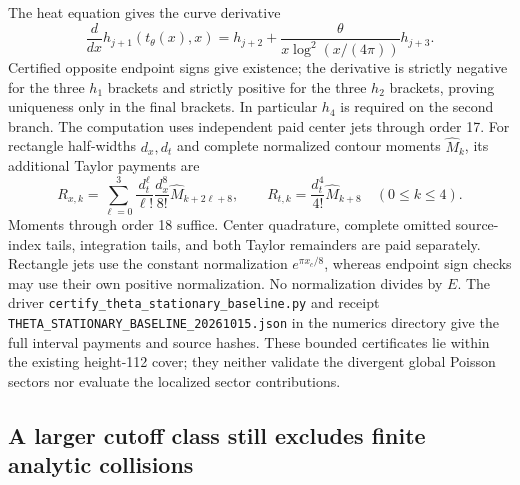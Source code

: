 \documentclass[11pt]{article}
\numberwithin{equation}{section}
\theoremstyle{definition}
\theoremstyle{remark}
\begin{document}
The heat equation gives the curve derivative
\[
 \frac{d}{dx}h_{j+1}(t_\theta(x),x)
 =h_{j+2}+\frac{\theta}{x\log^2(x/(4\pi))}h_{j+3}.
\]
Certified opposite endpoint signs give existence; the derivative is
strictly negative for the three $h_1$ brackets and strictly positive
for the three $h_2$ brackets, proving uniqueness only in the final
brackets.  In particular $h_4$ is required on the second branch.
The computation uses independent paid center jets through order 17.
For rectangle half-widths $d_x,d_t$ and complete normalized contour
moments $\widehat M_k$, its additional Taylor payments are
\[
 R_{x,k}=\sum_{\ell=0}^{3}\frac{d_t^\ell}{\ell!}
              \frac{d_x^8}{8!}\widehat M_{k+2\ell+8},\qquad
 R_{t,k}=\frac{d_t^4}{4!}\widehat M_{k+8}\quad(0\le k\le4).
\]
Moments through order 18 suffice.  Center quadrature, complete omitted
source-index tails, integration tails, and both Taylor remainders are
paid separately.  Rectangle jets use the constant normalization
$e^{\pi x_c/8}$, whereas endpoint sign checks may use their own
positive normalization. No normalization divides by $E$.
The driver \texttt{certify\_theta\_stationary\_baseline.py} and receipt
\texttt{THETA\_STATIONARY\_BASELINE\_20261015.json} in the numerics
directory give the full interval payments and source hashes.
These bounded certificates lie within the existing height-112 cover;
they neither validate the divergent global Poisson sectors nor evaluate
the localized sector contributions.

\subsection{A larger cutoff class still excludes finite analytic collisions}
\end{document}
